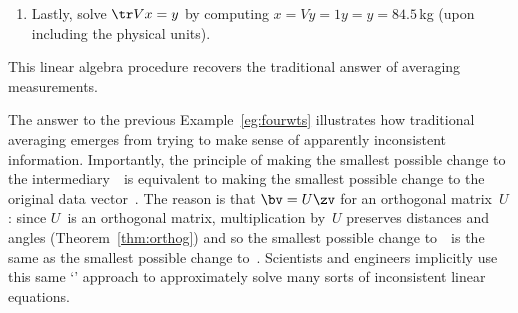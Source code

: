 \begin{example}
\begin{enumerate}
\item Lastly, solve \(\tr Vx=y\) by computing \(x=Vy=1y=y=84.5\)\,kg (upon including the physical units).
\end{enumerate}
This linear algebra procedure recovers the traditional answer of averaging measurements.
\end{example}

The answer to the previous Example~\ref{eg:fourwts} illustrates how traditional averaging emerges from trying to make sense of apparently inconsistent information.
Importantly, the principle of making the smallest possible change to the intermediary~\zv\ is equivalent to making the smallest possible change to the original data vector~\bv.
The reason is that \(\bv=U\zv\) for an orthogonal matrix~\(U\): since \(U\)~is an orthogonal matrix, multiplication by~\(U\) preserves distances and angles (Theorem~\ref{thm:orthog}) and so the smallest possible change to~\bv\ is the same as the smallest possible change to~\zv.
Scientists and engineers implicitly use this same `' approach to approximately solve many sorts of inconsistent linear equations.


